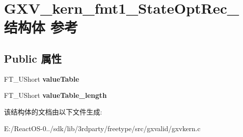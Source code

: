 \hypertarget{struct_g_x_v__kern__fmt1___state_opt_rec__}{}\section{G\+X\+V\+\_\+kern\+\_\+fmt1\+\_\+\+State\+Opt\+Rec\+\_\+结构体 参考}
\label{struct_g_x_v__kern__fmt1___state_opt_rec__}
\subsection*{Public 属性}
\begin{DoxyCompactItemize}
\item 
\mbox{\label{struct_g_x_v__kern__fmt1___state_opt_rec___a38fe4f68e9920da6fe8195149e67f738}} 
F\+T\+\_\+\+U\+Short {\bfseries value\+Table}
\item 
\mbox{\label{struct_g_x_v__kern__fmt1___state_opt_rec___a0fc314fdc527c2327d9e2fe385702184}} 
F\+T\+\_\+\+U\+Short {\bfseries value\+Table\+\_\+length}
\end{DoxyCompactItemize}


该结构体的文档由以下文件生成\+:\begin{DoxyCompactItemize}
\item 
E\+:/\+React\+O\+S-\/0../sdk/lib/3rdparty/freetype/src/gxvalid/gxvkern.\+c\end{DoxyCompactItemize}
